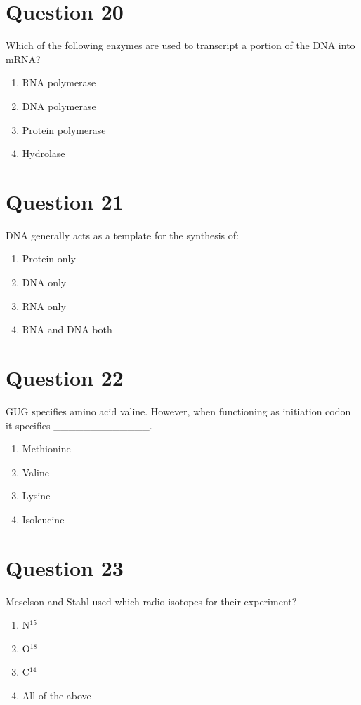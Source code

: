 \documentclass{article}
\begin{document}
\section*{Question 20}
Which of the following enzymes are used to transcript a portion of the DNA into mRNA?
\begin{enumerate}[label=(\alph*)]
\item RNA polymerase\newline
\item DNA polymerase
\item Protein polymerase
\item Hydrolase
\end{enumerate}
\newpage
\section*{Question 21}
DNA generally acts as a template for the synthesis of:
\begin{enumerate}[label=(\alph*)]
\item Protein only
\item DNA only
\item RNA only
\item RNA and DNA both
\end{enumerate}
\newpage
\section*{Question 22}
GUG specifies amino acid valine. However, when functioning as initiation codon it specifies _____________.
\begin{enumerate}[label=(\alph*)]
\item Methionine
\item Valine
\item Lysine
\item Isoleucine
\end{enumerate}
\newpage
\section*{Question 23}
Meselson and Stahl used which radio isotopes for their experiment?
\begin{enumerate}[label=(\alph*)]
\item N$^{15}$
\item O$^{18}$
\item C$^{14}$
\item All of the above
\end{enumerate}
\newpage
\end{document}
